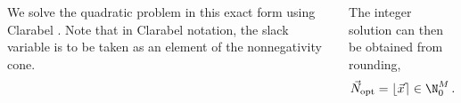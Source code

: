 \documentclass[25pt, a0paper, portrait]{tikzposter}
\begin{document}
\begin{columns}
{      We solve the quadratic problem in this exact form using Clarabel \cite{2024-clarabel}.
      Note that in Clarabel notation, the slack variable is to be taken as an element of the nonnegativity cone.

      The integer solution can then be obtained from rounding,
      $$\vec{N}_{\rm opt} = \lfloor \vec{x} \rceil \in \N_0^M\,.$$
    }

\end{columns}
\end{document}
